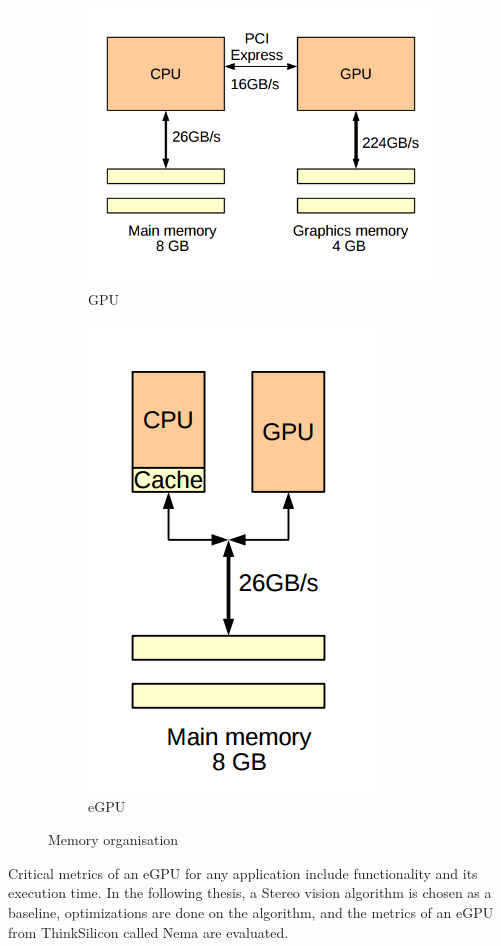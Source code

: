 \begin{figure}
\begin{subfigure}{.5\textwidth}
  \centering
  \includegraphics[width=.8\linewidth]{figures/memorygpu}
  \caption{GPU}
  \label{fig:sfig1}
\end{subfigure}%
\begin{subfigure}{.5\textwidth}
  \centering
  \includegraphics[width=.4\linewidth]{figures/memoryegpu}
  \caption{eGPU}
  \label{fig:sfig2}
\end{subfigure}
\caption{Memory organisation \cite{Collange2015}}
\label{fig:gpuegpu}
\end{figure}

Critical metrics of an eGPU for any application include functionality and its execution time. In the following thesis, a Stereo vision algorithm is chosen as a baseline, optimizations are done on the algorithm, and the metrics of an eGPU from ThinkSilicon called Nema are evaluated.\\

